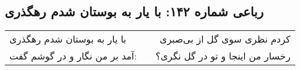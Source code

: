 \begin{center}
\section*{رباعی شماره ۱۴۲: با یار به بوستان شدم رهگذری}
\label{sec:142}
\begin{longtable}{l p{0.5cm} r}
با یار به بوستان شدم رهگذری
&&
کردم نظری سوی گل از بی‌صبری
\\
آمد بر من نگار و در گوشم گفت:
&&
رخسار من اینجا و تو در گل نگری؟
\\
\end{longtable}
\end{center}
